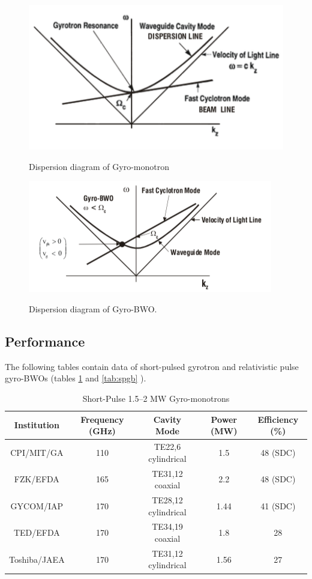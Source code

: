 \begin{figure}[H]
\centering
\includegraphics[scale=0.8]{images/gyro_mono_dispersion}
\label{fig:gmd}
\caption{Dispersion diagram of Gyro-monotron}
\end{figure}
\begin{figure}
\includegraphics{images/gyro_bwo_dispersion}
\label{fig:gbd}
\caption{Dispersion diagram of Gyro-BWO.}
\end{figure}



\subsection{Performance}
The following tables contain data of short-pulsed gyrotron and relativistic pulse gyro-BWOs (tables \ref{tab:spgm} and \ref{tab:spgb} ).

\begin{table}[H]
	\begin{tabular}{c|c|c|c|c}
	Institution & Frequency (GHz) & Cavity Mode & Power (MW) & Efficiency (\%) \\
	\hline
	CPI/MIT/GA & 110 & TE22,6 cylindrical & 1.5 & 48 (SDC)\\
	FZK/EFDA & 165 &TE31,12 coaxial & 2.2 & 48 (SDC)\\
	GYCOM/IAP & 170 & TE28,12 cylindrical &1.44 & 41 (SDC)\\
	TED/EFDA & 170 & TE34,19 coaxial & 1.8 & 28\\
	Toshiba/JAEA & 170 & TE31,12 cylindrical & 1.56 & 27
	\end{tabular}
	\caption{Short-Pulse 1.5–2 MW Gyro-monotrons\cite{ref:soa} }
	\label{tab:spgm}
\end{table}

